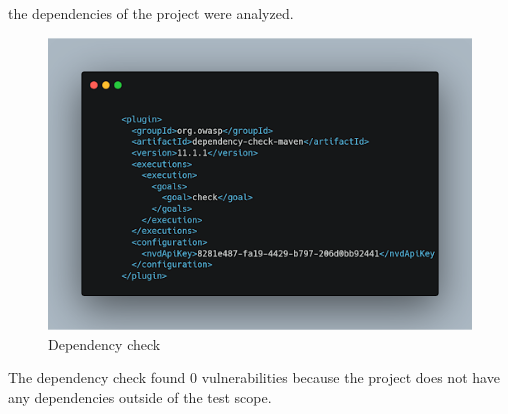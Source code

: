 \documentclass[sigconf]{acmart}
\begin{document}
the dependencies of the project were analyzed.

\begin{figure}[H]
    \centering
    \includegraphics[width=1\linewidth]{images/owasp3.png}
    \caption{Dependency check}
\end{figure}

The dependency check found 0 vulnerabilities because the project does not have any dependencies outside of the test scope.
\end{document}
